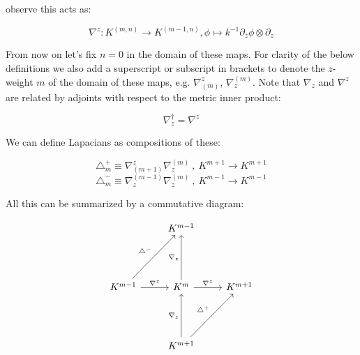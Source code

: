     observe this acts as:

    \begin{equation}
        \nabla^z: K^{(m, n)} \to K^{(m - 1, n)}, \phi \mapsto k^{-1}\partial_{\bar z} \phi \otimes \partial_{ z}
    \end{equation}

    From now on let's fix $n=0$ in the domain of these maps. For clarity of the below definitions we also add a superscript or subscript in brackets to denote the $z$-weight $m$ of the domain of these maps, e.g. $\nabla^z_{(m)}$, $\nabla_z^{(m)}$. Note that $\nabla_z$ and $\nabla^z$ are related by adjoints with respect to the metric inner product:

    \begin{equation}
        \nabla_z^\dagger = \nabla^z
    \end{equation}

    We can define Lapacians as compositions of these:

    \begin{equation}
        \triangle^+_m \equiv \nabla^z_{(m+1)} \nabla_z^{(m)}~,~ K^{m+1} \to K^{m + 1}
    \end{equation}
    \begin{equation}
        \triangle^-_m \equiv \nabla_z^{(m-1)} \nabla_z^{(m)}~,~ K^{m-1} \to K^{m - 1}
    \end{equation}

    All this can be summarized by a commutative diagram:

    \begin{equation}
        \begin{tikzcd}[row sep=4.5em]
            & K^{m-1} \\
            K^{m-1} \arrow{r}{\nabla^z}
            \arrow{ru}{\triangle^-} & K^m \arrow{u}{\nabla_z}
            \arrow{r}{\nabla^z} & K^{m+1}\\
            &K^{m+1} \arrow{ru}{\triangle^+} \arrow{u}{\nabla_z}
        \end{tikzcd}
    \end{equation}
